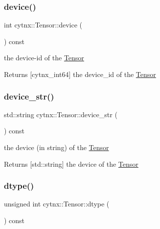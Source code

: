 \subsubsection{\texorpdfstring{device()}{device()}}
{\footnotesize\ttfamily int cytnx\+::\+Tensor\+::device (\begin{DoxyParamCaption}{ }\end{DoxyParamCaption}) const\hspace{0.3cm}{\ttfamily [inline]}}



the device-\/id of the \hyperlink{classcytnx_1_1Tensor}{Tensor} 

\begin{DoxyReturn}{Returns}
\mbox{[}cytnx\+\_\+int64\mbox{]} the device\+\_\+id of the \hyperlink{classcytnx_1_1Tensor}{Tensor} 
\end{DoxyReturn}
\mbox{\label{classcytnx_1_1Tensor_a335f7625fa01784f49b2223238d0c14e}} 
\subsubsection{\texorpdfstring{device\+\_\+str()}{device\_str()}}
{\footnotesize\ttfamily std\+::string cytnx\+::\+Tensor\+::device\+\_\+str (\begin{DoxyParamCaption}{ }\end{DoxyParamCaption}) const\hspace{0.3cm}{\ttfamily [inline]}}



the device (in string) of the \hyperlink{classcytnx_1_1Tensor}{Tensor} 

\begin{DoxyReturn}{Returns}
\mbox{[}std\+::string\mbox{]} the device of the \hyperlink{classcytnx_1_1Tensor}{Tensor} 
\end{DoxyReturn}
\mbox{\label{classcytnx_1_1Tensor_a4472af6f8e825a13440e832bf82fb627}} 
\subsubsection{\texorpdfstring{dtype()}{dtype()}}
{\footnotesize\ttfamily unsigned int cytnx\+::\+Tensor\+::dtype (\begin{DoxyParamCaption}{ }\end{DoxyParamCaption}) const\hspace{0.3cm}{\ttfamily [inline]}}



